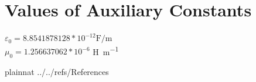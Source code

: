 \documentclass[12pt]{article}
\begin{document}
	
	
	\section{Values of Auxiliary Constants}
	
	$\varepsilon_{0} = 8.8541878128 * 10^{-12} \si{\farad\per \meter}$ \\ $\mu_{0} =
	1.256637062 * 10^{-6}$ \si{\henry \per \meter} \\
	
	\newpage
	
	 {plainnat}  {../../refs/References}
	
	
\end{document}
